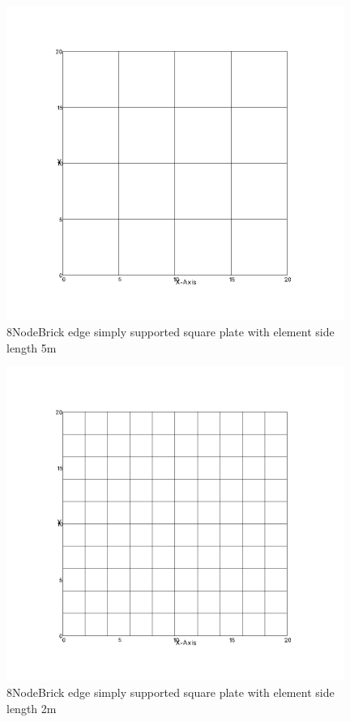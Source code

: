 \documentclass[fleqn,11pt,letter]{article}
\begin{document}
\newpage

\begin{figure}[H]
  \centering
  \includegraphics[width=11cm]{../Figure_files/8NodeBrick/square_plate2.png}
  \caption{8NodeBrick edge simply supported square plate with element side length 5m }
  \label{fig 8NodeBrick edges simply supported square plate with element side length 5m }
\end{figure}


\begin{figure}[H]
  \centering
  \includegraphics[width=11cm]{../Figure_files/8NodeBrick/square_plate3.png}
  \caption{8NodeBrick edge simply supported square plate with element side length 2m }
  \label{fig 8NodeBrick edges simply supported square plate with element side length 2m }
\end{figure}
\end{document}
